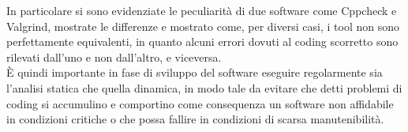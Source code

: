 \documentclass{article}
\begin{document}
In particolare si sono evidenziate le peculiarità di due software come Cppcheck
e Valgrind, mostrate le differenze e mostrato come, per diversi casi, i tool non
sono perfettamente equivalenti, in quanto alcuni errori dovuti al coding
scorretto sono rilevati dall'uno e non dall'altro, e viceversa. \\

È quindi importante in fase di sviluppo del software eseguire regolarmente sia
l'analisi statica che quella dinamica, in modo tale da evitare che detti
problemi di coding si accumulino e comportino come consequenza un software non
affidabile in condizioni critiche o che possa fallire in condizioni di scarsa manutenibilità.
\end{document}
